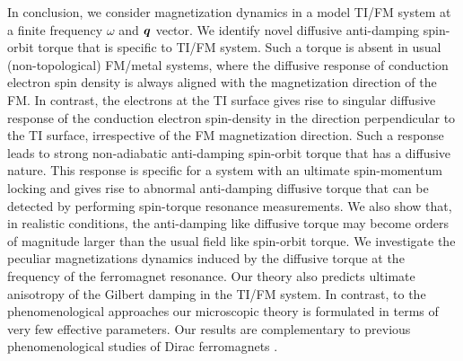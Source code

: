 In conclusion, we consider magnetization dynamics in a model TI/FM system at a finite frequency $\omega$ and $\boldsymbol{q}$ vector. We identify novel diffusive anti-damping spin-orbit torque that is specific to TI/FM system.  Such a torque is absent in usual (non-topological) FM/metal systems, where the diffusive response of conduction electron spin density is always aligned with the magnetization direction of the FM. In contrast, the electrons at the TI surface gives rise to singular diffusive response of the conduction electron spin-density in the direction perpendicular to the TI surface, irrespective of the FM magnetization direction. Such a response leads to strong non-adiabatic anti-damping spin-orbit torque that has a diffusive nature. This response is specific for a system with an ultimate spin-momentum locking and gives rise to abnormal anti-damping diffusive torque that can be detected by performing spin-torque resonance measurements. We also show that, in realistic conditions, the anti-damping like diffusive torque may become orders of magnitude larger than the usual field like spin-orbit torque. We investigate the peculiar magnetizations dynamics induced by the diffusive torque at the frequency of the ferromagnet resonance. Our theory also predicts ultimate anisotropy of the Gilbert damping in the TI/FM system. In contrast, to the phenomenological approaches \cite{vanderBijl2012,Hals2013} our microscopic theory is formulated in terms of very few effective parameters. Our results are complementary to previous phenomenological studies of Dirac ferromagnets \cite{tserkovnyak_theory_2009,mahfouzi_spin-orbit_2012,katsnelson15,fischer_spin-torque_2016,yokoyama_theoretical_2010,yokoyama_current-induced_2011,siu_spin_2016,mahfouzi_antidamping_2016,soleimani_spin-orbit_2017,kurebayashi_microscopic_2017,chen_current-induced_2017,rodriguez-vega_giant_2016,qi_topological_2008,garate_inverse_2010,yokoyama_theoretical_2010,yokoyama_current-induced_2011,nomura_electric_2010,tserkovnyak_thin-film_2012-1,linder_improved_2014,tserkovnyak_spin_2015,ueda_topological_2012,liu_reading_2013,chang_nonequilibrium_2015,fischer_spin-torque_2016,mahfouzi_antidamping_2016,fujimoto_transport_2014,okuma_unconventional_2016}.


